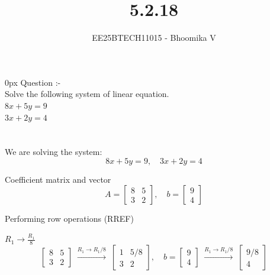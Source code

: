 \documentclass[journal]{IEEEtran}
\begin{document}

\vspace{3cm}

\title{5.2.18}
\author{EE25BTECH11015 - Bhoomika V}
{\let\newpage\relax\maketitle}

\renewcommand{\thefigure}{\theenumi}
\renewcommand{\thetable}{\theenumi}
\setlength{\intextsep}{10pt} %


\renewcommand{\thetable}{\theenumi}
\parindent 0px 
{Question :-} \\ 
Solve the following system of linear equation.\\ 
$8x + 5y = 9$\\ 
$3x + 2y = 4$\\ \\ 
\solution \\
We are solving the system:
\[
8x + 5y = 9, \quad 3x + 2y = 4
\]

Coefficient matrix and vector
\[
A = \begin{bmatrix} 8 & 5 \\ 3 & 2 \end{bmatrix}, \quad 
b = \begin{bmatrix} 9 \\ 4 \end{bmatrix}
\]

 Performing row operations (RREF)

\(R_1 \to \frac{R_1}{8}\)
\[
\begin{bmatrix} 8 & 5 \\ 3 & 2 \end{bmatrix} 
\;\overset{R_1 \to R_1/8}{\longrightarrow}\;
\begin{bmatrix} 1 & 5/8 \\ 3 & 2 \end{bmatrix}, \quad
b = \begin{bmatrix} 9 \\ 4 \end{bmatrix} 
\;\overset{R_1 \to R_1/8}{\longrightarrow}\;
\begin{bmatrix} 9/8 \\ 4 \end{bmatrix}
\]
\end{document}
